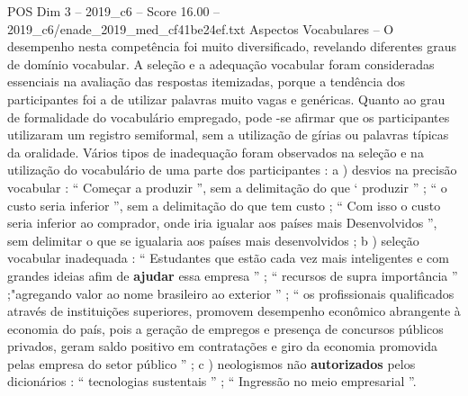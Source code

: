 \begin{textsample}{POS Dim 3 – 2019\_c6 – Score 16.00 – 2019\_c6/enade\_2019\_med\_cf41be24ef.txt}
Aspectos Vocabulares – O desempenho nesta competência foi muito diversificado, revelando diferentes graus de domínio vocabular.
A seleção e a adequação vocabular foram consideradas essenciais na avaliação das respostas itemizadas, porque a tendência dos participantes foi a de utilizar palavras muito vagas e genéricas.
Quanto ao grau de formalidade do vocabulário empregado, pode -se afirmar que os participantes utilizaram um registro semiformal, sem a utilização de gírias ou palavras típicas da oralidade.
Vários tipos de inadequação foram observados na seleção e na utilização do vocabulário de uma parte dos participantes : a ) desvios na precisão vocabular : “ Começar a produzir ”, sem a delimitação do que ‘ produzir ” ; “ o custo seria inferior ”, sem a delimitação do que tem custo ; “ Com isso o custo seria inferior ao comprador, onde iria igualar aos países mais Desenvolvidos ”, sem delimitar o que se igualaria aos países mais desenvolvidos ; b ) seleção vocabular inadequada : “ Estudantes que estão cada vez mais inteligentes e com grandes ideias afim de \textbf{ajudar} essa empresa ” ; “ recursos de supra importância ” ;"agregando valor ao nome brasileiro ao exterior ” ; “ os profissionais qualificados através de instituições superiores, promovem desempenho econômico abrangente à economia do país, pois a geração de empregos e presença de concursos públicos privados, geram saldo positivo em contratações e giro da economia promovida pelas empresa do setor público ” ; c ) neologismos não \textbf{autorizados} pelos dicionários : “ tecnologias sustentais ” ; “ Ingressão no meio empresarial ”.

\end{textsample}
